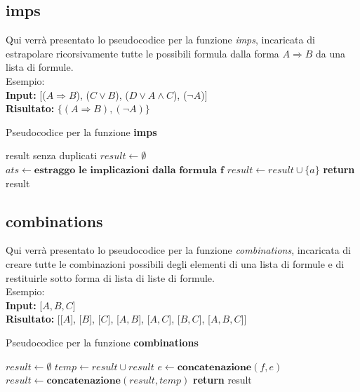 \documentclass[\main/tesi.tex]{subfiles}
\begin{document}
\subsection{imps}
Qui verrà presentato lo pseudocodice per la funzione \textit{imps}, incaricata di estrapolare ricorsivamente tutte le possibili formula dalla forma $A \Rightarrow B$ da una lista di formule. \\
Esempio: \\
\textbf{Input:} [($A \Rightarrow B$), ($C \lor B$), ($D \lor A \land C$), ($\neg A$)] \\
\textbf{Risultato:} $\{(A \Rightarrow B), (\neg A)\}$

\begin{algorithm}
    \caption{Pseudocodice per la funzione \textbf{imps}}\label{alg:imps}
    \begin{algorithmic}
        \Ensure result senza duplicati
        \State $result \gets \emptyset$
        \State $ats \gets \textbf{estraggo le implicazioni dalla formula f}$
        \State $result \gets result \cup \{a\}$
        \EndIf
        \EndFor
        \EndFor
        \State \textbf{return} result
        \EndFunction
    \end{algorithmic}
\end{algorithm}

\newpage

\subsection{combinations}
Qui verrà presentato lo pseudocodice per la funzione \textit{combinations}, incaricata di creare tutte le combinazioni possibili degli elementi di una lista di formule e di restituirle sotto forma di lista di liste di formule. \\
Esempio: \\
\textbf{Input:} [$A, B, C$] \\
\textbf{Risultato:} [[$A$], [$B$], [$C$], [$A, B$], [$A, C$], [$B, C$], [$A, B, C$]]

\begin{algorithm}
    \caption{Pseudocodice per la funzione \textbf{combinations}}\label{alg:combinations}
    \begin{algorithmic}
        \State $result \gets \emptyset$
        \State $temp \gets result \cup result$
        \State $e \gets \textbf{concatenazione}(f, e)$
        \EndFor
        \State $result \gets \textbf{concatenazione}(result, temp)$
        \EndFor
        \State \textbf{return} result
        \EndFunction
    \end{algorithmic}
\end{algorithm}
\end{document}
